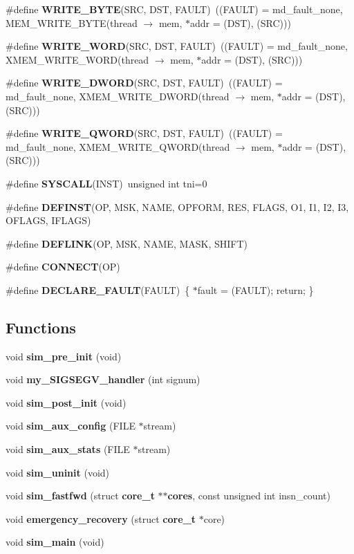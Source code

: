 \begin{CompactItemize}
\item 
\#define {\bf WRITE\_\-BYTE}(SRC, DST, FAULT)~((FAULT) = md\_\-fault\_\-none, MEM\_\-WRITE\_\-BYTE(thread $\rightarrow$ mem, $\ast$addr = (DST), (SRC)))
\item 
\#define {\bf WRITE\_\-WORD}(SRC, DST, FAULT)~((FAULT) = md\_\-fault\_\-none, XMEM\_\-WRITE\_\-WORD(thread $\rightarrow$ mem, $\ast$addr = (DST), (SRC)))
\item 
\#define {\bf WRITE\_\-DWORD}(SRC, DST, FAULT)~((FAULT) = md\_\-fault\_\-none, XMEM\_\-WRITE\_\-DWORD(thread $\rightarrow$ mem, $\ast$addr = (DST), (SRC)))
\item 
\#define {\bf WRITE\_\-QWORD}(SRC, DST, FAULT)~((FAULT) = md\_\-fault\_\-none, XMEM\_\-WRITE\_\-QWORD(thread $\rightarrow$ mem, $\ast$addr = (DST), (SRC)))
\item 
\#define {\bf SYSCALL}(INST)~unsigned int tni=0
\item 
\#define {\bf DEFINST}(OP, MSK, NAME, OPFORM, RES, FLAGS, O1, I1, I2, I3, OFLAGS, IFLAGS)
\item 
\#define {\bf DEFLINK}(OP, MSK, NAME, MASK, SHIFT)
\item 
\#define {\bf CONNECT}(OP)
\item 
\#define {\bf DECLARE\_\-FAULT}(FAULT)~\{ $\ast$fault = (FAULT); return; \}
\end{CompactItemize}
\subsection*{Functions}
\begin{CompactItemize}
\item 
void {\bf sim\_\-pre\_\-init} (void)
\item 
void {\bf my\_\-SIGSEGV\_\-handler} (int signum)
\item 
void {\bf sim\_\-post\_\-init} (void)
\item 
void {\bf sim\_\-aux\_\-config} (FILE $\ast$stream)
\item 
void {\bf sim\_\-aux\_\-stats} (FILE $\ast$stream)
\item 
void {\bf sim\_\-uninit} (void)
\item 
void {\bf sim\_\-fastfwd} (struct {\bf core\_\-t} $\ast$$\ast${\bf cores}, const unsigned int insn\_\-count)
\item 
void {\bf emergency\_\-recovery} (struct {\bf core\_\-t} $\ast$core)
\item 
void {\bf sim\_\-main} (void)
\end{CompactItemize}
